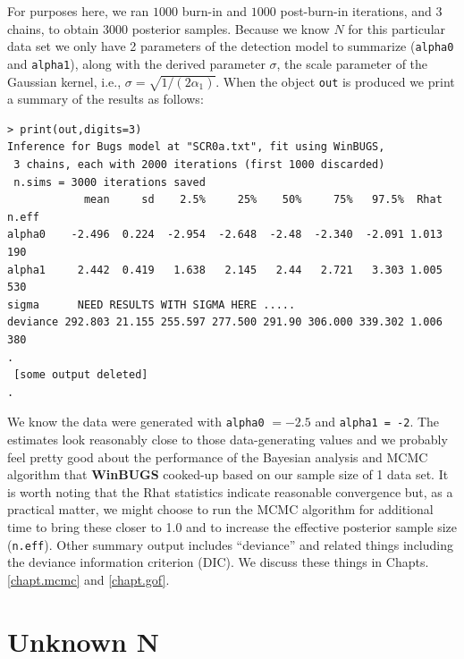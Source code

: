 For purposes here, we ran $1000$ burn-in and $1000$ post-burn-in
iterations, and 3 chains,
to obtain 3000 posterior samples.  Because we know $N$ for this
particular data set we only have 2 parameters of the detection model
to summarize (\mbox{\tt alpha0} and \mbox{\tt alpha1}), along with the
derived parameter $\sigma$, the scale parameter of the Gaussian
kernel, i.e., $\sigma = \sqrt{1/(2\alpha_{1})}$.  When the
object \mbox{\tt out} is produced we print a summary of the results as
follows:
{\small
\begin{verbatim}
> print(out,digits=3)
Inference for Bugs model at "SCR0a.txt", fit using WinBUGS,
 3 chains, each with 2000 iterations (first 1000 discarded)
 n.sims = 3000 iterations saved
            mean     sd    2.5%     25%    50%     75%   97.5%  Rhat n.eff
alpha0    -2.496  0.224  -2.954  -2.648  -2.48  -2.340  -2.091 1.013   190
alpha1     2.442  0.419   1.638   2.145   2.44   2.721   3.303 1.005   530
sigma      NEED RESULTS WITH SIGMA HERE .....
deviance 292.803 21.155 255.597 277.500 291.90 306.000 339.302 1.006   380
.
 [some output deleted]
.
\end{verbatim}
}
We know the data were generated with \mbox{\tt alpha0} $= -2.5$ and
\mbox{\tt alpha1 = -2}. The estimates look reasonably close to those
data-generating values and we probably feel pretty good about the
performance of the Bayesian analysis and MCMC algorithm that {\bf WinBUGS}
cooked-up based on our sample size of 1 data set.  It is worth noting
that the Rhat statistics indicate reasonable convergence but, as a
practical matter, we might choose to run the MCMC algorithm for
additional time to bring these closer to 1.0 and to increase the
effective posterior sample size (\mbox{\tt n.eff}). Other summary output includes
``deviance'' and related things including the deviance information
criterion (DIC). We discuss these things in Chapts. \ref{chapt.mcmc}
and \ref{chapt.gof}.



\section{Unknown N}
\label{scr0.sec.unknownN}

